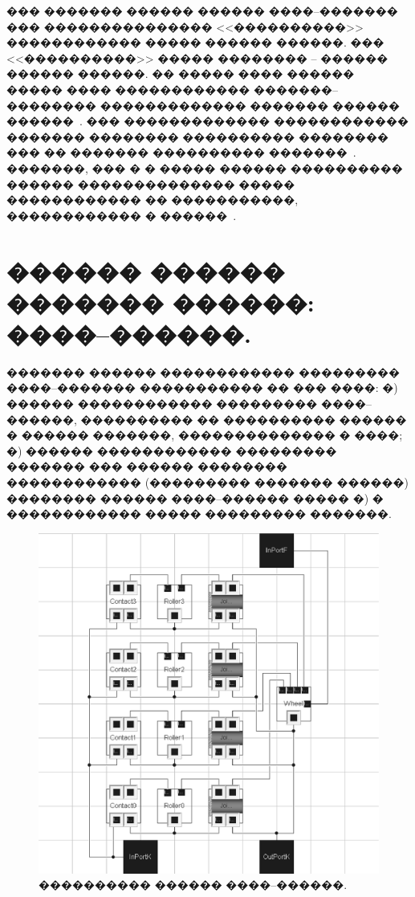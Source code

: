 \documentclass[12pt,a4paper]{article}
\begin{document}
��� ������� ������ ������ ����--������� ��� ��������������� <<����������>>
������������ ����� ������ ������. ��� <<����������>> ����� �������� -- ������
������ ������. �� ����� ���� ������ ����� ���� ������������ �������--�������� 
������������� ������� ������ ������~\cite{Kosenko2006}. ��� ������������� 
������������ ������� �������� ���������� �������� ��� �� ������� ���������� 
�������~\cite{Novozhilov}. �������, ��� � � ����� ������ ���������� ������ 
�������������� ����� ������������ �� �����������, ������������ � 
������~\cite{Kosenko2006}.

\section{������ ������ ������� ������: ����--������.\ }
\label{sec4}
������� ������ ������������ ��������� ����--������� ����������� �� ��� ����:
�) ������ ������������ ��������� ����--������, ���������� �� ���������� ������
� ������ �������, �������������� � ����; �) ������ ������������ ���������
������� ��� ������ �������� ������������ (��������� ������� ������) �������� 
������ ����--������ ����� �) � ������������ ����� ��������� �������.

\begin{figure}[htb]
\centering\includegraphics[width=15cm]{OmniWheelModel.eps}
\caption{���������� ������ ����--������.}
\label{OmniWheelModel}
\end{figure}
\end{document}
